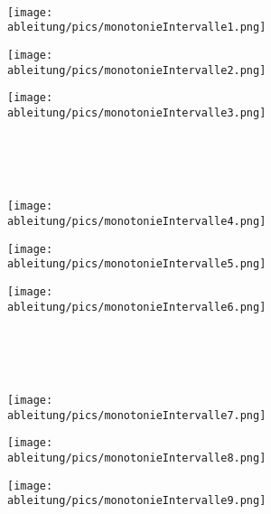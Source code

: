 \newpage
\begin{Exercise}[title={\raggedright Bestimme die Monotonieintervalle.}, label=monotonieA1]\\
	\begin{minipage}{\textwidth}
		\begin{minipage}{0.33\textwidth}
			\centering\texttt{[image: \\ableitung/pics/monotonieIntervalle1.png]}\\
		\end{minipage}
		\begin{minipage}{0.33\textwidth}
			\centering\texttt{[image: \\ableitung/pics/monotonieIntervalle2.png]}\\
		\end{minipage}
		\begin{minipage}{0.33\textwidth}
			\centering\texttt{[image: \\ableitung/pics/monotonieIntervalle3.png]}\\
		\end{minipage}\\ \\ \\
		\begin{minipage}{0.33\textwidth}
			\centering\texttt{[image: \\ableitung/pics/monotonieIntervalle4.png]}\\
		\end{minipage}
		\begin{minipage}{0.33\textwidth}
			\centering\texttt{[image: \\ableitung/pics/monotonieIntervalle5.png]}\\
		\end{minipage}
		\begin{minipage}{0.33\textwidth}
			\centering\texttt{[image: \\ableitung/pics/monotonieIntervalle6.png]}\\
		\end{minipage}\\ \\ \\
		\begin{minipage}{0.33\textwidth}
			\centering\texttt{[image: \\ableitung/pics/monotonieIntervalle7.png]}\\
		\end{minipage}
		\begin{minipage}{0.33\textwidth}
			\centering\texttt{[image: \\ableitung/pics/monotonieIntervalle8.png]}\\
		\end{minipage}
		\begin{minipage}{0.33\textwidth}
			\centering\texttt{[image: \\ableitung/pics/monotonieIntervalle9.png]}\\
		\end{minipage}\\ \\ \\
	\end{minipage}
\end{Exercise}
